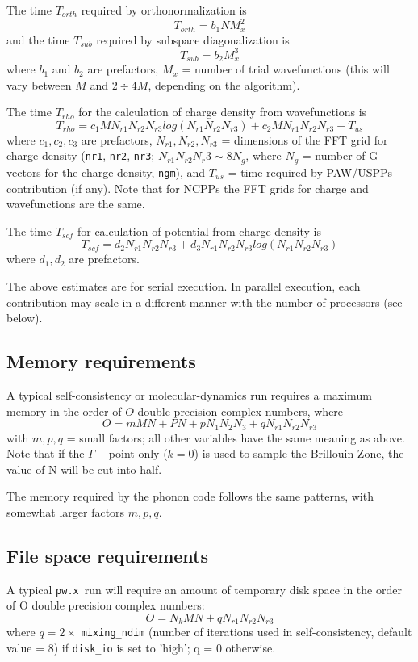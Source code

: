 \documentclass[12pt,a4paper]{article}
\def\pw.x{\texttt{pw.x}}
\begin{document}
The time $T_{orth}$ required by orthonormalization is
$$T_{orth} = b_1 N M_x^2$$ 
and the time $T_{sub}$ required by subspace diagonalization is
$$T_{sub} = b_2 M_x^3$$
where $b_1$ and $b_2$ are prefactors, $M_x$ = number of trial wavefunctions 
(this will vary between $M$ and $2\div4 M$, depending on the algorithm).
    
The time $T_{rho}$ for the calculation of charge density from wavefunctions is
$$T_{rho} = c_1 M N_{r1} N_{r2}N_{r3} log(N_{r1} N_{r2} N_{r3}) + 
            c_2 M N_{r1} N_{r2} N_{r3} + T_{us}$$
where $c_1, c_2, c_3$ are prefactors, $N_{r1}, N_{r2}, N_{r3}$ =
dimensions of the FFT grid for charge density (\texttt{nr1},
\texttt{nr2}, \texttt{nr3}; $N_{r1} N_{r2} N_r3 \sim 8N_g$,
where $N_g$ = number of G-vectors for the charge density,
\texttt{ngm}), and 
$T_{us}$ = time required by PAW/USPPs contribution (if any).
Note that for NCPPs the FFT grids for charge and
wavefunctions are the same.
 
The time $T_{scf}$ for calculation of potential from charge density is
$$T_{scf} = d_2 N_{r1} N_{r2} N_{r3} + d_3 N_{r1} N_{r2} N_{r3} 
            log(N_{r1} N_{r2} N_{r3} )$$
where $d_1, d_2$ are prefactors.

The above estimates are for serial execution. In parallel execution,
each contribution may scale in a different manner with the number of processors (see below).

\subsection{Memory requirements}

A typical self-consistency or molecular-dynamics run requires a maximum
memory in the order of $O$ double precision complex numbers, where
$$ O = m M N + P N + p N_1 N_2 N_3 + q N_{r1} N_{r2} N_{r3}$$
with $m, p, q$ = small factors; all other variables have the same meaning as
above. Note that if the $\Gamma-$point only ($k=0$) is used to sample the 
Brillouin Zone, the value of N will be cut into half.

The memory required by the phonon code follows the same patterns, with
somewhat larger factors $m, p, q$.

\subsection{File space requirements}

A typical \pw.x\ run will require an amount of temporary disk space in the
order of O double precision complex numbers:
$$O = N_k M N + q N_{r1} N_{r2}N_{r3}$$
where $q = 2\times$ \texttt{mixing\_ndim} (number of iterations used in 
self-consistency, default value = 8) if \texttt{disk\_io} is set to 'high'; q = 0 
otherwise.
\end{document}

